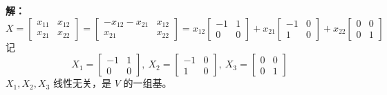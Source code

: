 \documentclass{article}
\begin{document}
\textbf{解：}
\[
X = \begin{bmatrix} x_{11} & x_{12} \\ x_{21} & x_{22} \end{bmatrix}
= \begin{bmatrix} -x_{12}-x_{21} & x_{12} \\ x_{21} & x_{22} \end{bmatrix}
= x_{12}\begin{bmatrix} -1 & 1 \\ 0 & 0 \end{bmatrix}
+ x_{21}\begin{bmatrix} -1 & 0 \\ 1 & 0 \end{bmatrix}
+ x_{22}\begin{bmatrix} 0 & 0 \\ 0 & 1 \end{bmatrix}
\]
记
\[
X_1 = \begin{bmatrix} -1 & 1 \\ 0 & 0 \end{bmatrix},\ X_2 = \begin{bmatrix} -1 & 0 \\ 1 & 0 \end{bmatrix},\ X_3 = \begin{bmatrix} 0 & 0 \\ 0 & 1 \end{bmatrix}
\]
$X_1,X_2,X_3$ 线性无关，是 $V$ 的一组基。
\end{document}
